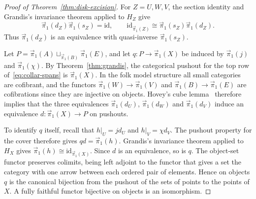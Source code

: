 \documentclass[12pt,a4paper]{amsart}
\theoremstyle{definition}
\renewcommand{\vec}{\overrightarrow}
\newcommand{\PiC}{\vec{\pi}_1}
\begin{document}
\begin{proof}[Proof of Theorem~\ref{thm:disk-excision}]
For $Z=U,W,V$, the section identity and Grandis's invariance theorem applied to $H_Z$ give
\[
 \PiC(d_Z)\PiC(s_Z)=\mathrm{id},\qquad
 \mathrm{id}_{\PiC(Z)}\cong\PiC(s_Z)\PiC(d_Z).
\]
Thus $\PiC(d_Z)$ is an equivalence with quasi-inverse $\PiC(s_Z)$.

Let $P=\PiC(A)\sqcup_{\PiC(B)}\PiC(E)$, and let $q\colon P\to\PiC(X)$ be induced by $\PiC(j)$ and $\PiC(\chi)$. By Theorem~\ref{thm:grandis}, the categorical pushout for the top row of~\eqref{eq:collar-spans} is $\PiC(X)$. In the folk model structure all small categories are cofibrant, and the functors $\PiC(W)\to\PiC(V)$ and $\PiC(B)\to\PiC(E)$ are cofibrations since they are injective on objects. Hovey's cube lemma~\cite[Lemma~5.2.6]{MR99h:55031} therefore implies that the three equivalences $\PiC(d_U)$, $\PiC(d_W)$ and $\PiC(d_V)$ induce an equivalence $d\colon\PiC(X)\to P$ on pushouts.

To identify $q$ itself, recall that $h|_U=jd_U$ and $h|_V=\chi d_V$. The pushout property for the cover therefore gives $qd=\PiC(h)$. Grandis's invariance theorem applied to $H_X$ gives $\PiC(h)\cong\mathrm{id}_{\PiC(X)}$. Since $d$ is an equivalence, so is $q$. The object-set functor preserves colimits, being left adjoint to the functor that gives a set the category with one arrow between each ordered pair of elements. Hence on objects $q$ is the canonical bijection from the pushout of the sets of points to the points of $X$. A fully faithful functor bijective on objects is an isomorphism.
\end{proof}
\end{document}

